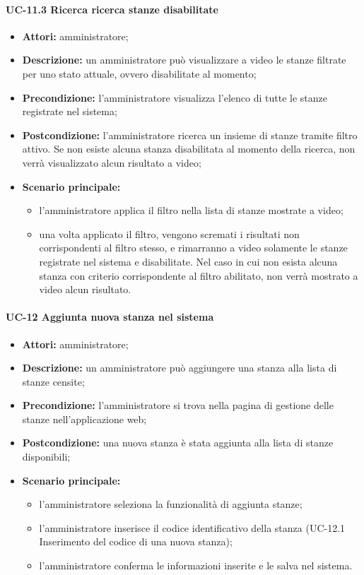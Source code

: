 \paragraph{UC-11.3 Ricerca ricerca stanze disabilitate}
\begin{itemize}
    \item \textbf{Attori:} amministratore;
    \item \textbf{Descrizione:} un amministratore pu\`{o} visualizzare a video le stanze filtrate per uno stato attuale, ovvero disabilitate al momento;
    \item \textbf{Precondizione:} l'amministratore visualizza l'elenco di tutte le stanze registrate nel sistema;
    \item \textbf{Postcondizione:} l'amministratore ricerca un insieme di stanze tramite filtro attivo. Se non esiste alcuna stanza disabilitata al momento della ricerca, non verrà visualizzato alcun risultato a video;
    \item \textbf{Scenario principale:}
    \begin{itemize}
        \item l'amministratore applica il filtro nella lista di stanze mostrate a video;
        \item una volta applicato il filtro, vengono scremati i risultati non corrispondenti al filtro stesso, e rimarranno a video solamente le stanze registrate nel sistema e disabilitate. Nel caso in cui non esista alcuna stanza con criterio corrispondente al filtro abilitato, non verrà mostrato a video alcun risultato.
    \end{itemize}
\end{itemize}


\paragraph{UC-12 Aggiunta nuova stanza nel sistema}
\begin{itemize}
    \item \textbf{Attori:} amministratore;
    \item \textbf{Descrizione:} un amministratore pu\`{o} aggiungere una stanza alla lista di stanze censite;
    \item \textbf{Precondizione:} l'amministratore si trova nella pagina di gestione delle stanze nell'applicazione web;
    \item \textbf{Postcondizione:} una nuova stanza \`{e} stata aggiunta alla lista di stanze disponibili;
    \item \textbf{Scenario principale:}
    \begin{itemize}
        \item l'amministratore seleziona la funzionalità di aggiunta stanze;
        \item l'amministratore inserisce il codice identificativo della stanza (UC-12.1 Inserimento del codice di una nuova stanza);
        \item l'amministratore conferma le informazioni inserite e le salva nel sistema.
    \end{itemize}
\end{itemize}


